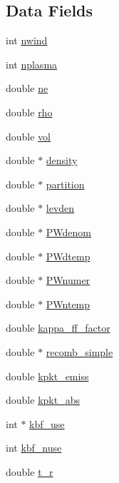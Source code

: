 \subsection*{Data Fields}
\begin{DoxyCompactItemize}
\item 
int \hyperlink{structplasma_a56c7e960c18e2fc47a147877bc9e5fe8}{nwind}
\item 
int \hyperlink{structplasma_a8220b5d466addc895b973f092d9b7b15}{nplasma}
\item 
double \hyperlink{structplasma_ac1d38c3e4cc4ef2a1e4d83d7f8b71d22}{ne}
\item 
double \hyperlink{structplasma_aeffd93110218aa8876f074488b026390}{rho}
\item 
double \hyperlink{structplasma_a469869b2b7b2a822716ac5a3ba58412a}{vol}
\item 
double $\ast$ \hyperlink{structplasma_a711ac1ddc0f32849edd96d937ff70761}{density}
\item 
double $\ast$ \hyperlink{structplasma_a76771b8118b11b955ccf91b6208b42f4}{partition}
\item 
double $\ast$ \hyperlink{structplasma_a4fb98583700310c3abbf6fa266c755c0}{levden}
\item 
double $\ast$ \hyperlink{structplasma_a2b0e1368d0adfd432627a2ceedebb704}{P\+Wdenom}
\item 
double $\ast$ \hyperlink{structplasma_a2651f0307bf16fc9febad1be3c7bbfd0}{P\+Wdtemp}
\item 
double $\ast$ \hyperlink{structplasma_a4d5152400f3815e3097ef30ff27aec5c}{P\+Wnumer}
\item 
double $\ast$ \hyperlink{structplasma_a712f96fb8bc5b68b5b51024043614e53}{P\+Wntemp}
\item 
double \hyperlink{structplasma_ad9ee8e24644a60e13bcf910a223c129b}{kappa\+\_\+ff\+\_\+factor}
\item 
double $\ast$ \hyperlink{structplasma_ae4b9e1c0afc70066b36d896e8122513b}{recomb\+\_\+simple}
\item 
double \hyperlink{structplasma_a3a7cb2d0cfcfe01e21e43f7e4fe4e9a8}{kpkt\+\_\+emiss}
\item 
double \hyperlink{structplasma_aa9ee2846f568c0a0de1f7848ff747301}{kpkt\+\_\+abs}
\item 
int $\ast$ \hyperlink{structplasma_a031771037948baffc308ebe398140f4e}{kbf\+\_\+use}
\item 
int \hyperlink{structplasma_a5771e457f1bb0258f23f9aa3b97febeb}{kbf\+\_\+nuse}
\item 
double \hyperlink{structplasma_a432a1f85db9000aac743588736fb6048}{t\+\_\+r}

\end{DoxyCompactItemize}
